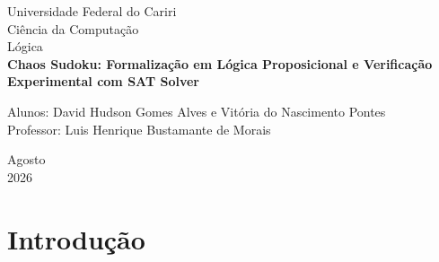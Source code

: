 \documentclass[a4paper, 12pt]{article}
\begin{document}

\begin{titlepage}
	\begin{center}
	

		\Huge{Universidade Federal do Cariri}\\
		\large{Ciência da Computação}\\ 
		\large{Lógica}\\ 
		\vspace{15pt}
        \vspace{95pt}
        \textbf{\LARGE{Chaos Sudoku: Formalização em Lógica Proposicional e Verificação Experimental com SAT Solver}}\\
		\vspace{3,5cm}
	\end{center}
	
	\begin{flushleft}
		\begin{tabbing}
			Alunos: David Hudson Gomes Alves e Vitória do Nascimento Pontes \\
			Professor: Luis Henrique Bustamante de Morais \\
	\end{tabbing}
 \end{flushleft}
	\vspace{1cm}
	
	\begin{center}
		\vspace{\fill}
			 Agosto\\
		 2026
			\end{center}
\end{titlepage}


\newpage
\tableofcontents
\thispagestyle{empty}

\newpage
{}

\section{Introdução}
\end{document}
